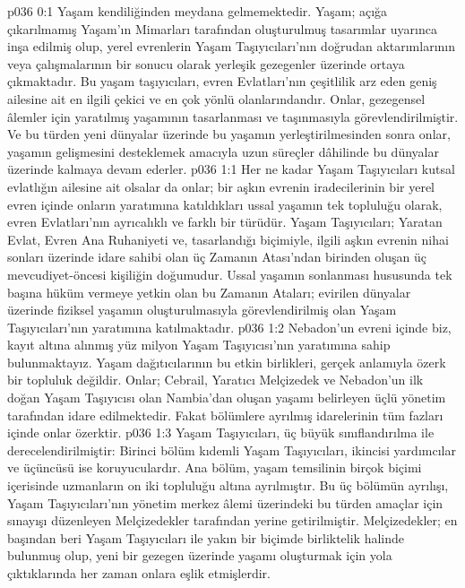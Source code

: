 \vs p036 0:1 Yaşam kendiliğinden meydana gelmemektedir. Yaşam; açığa çıkarılmamış Yaşam’ın Mimarları tarafından oluşturulmuş tasarımlar uyarınca inşa edilmiş olup, yerel evrenlerin Yaşam Taşıyıcıları’nın doğrudan aktarımlarının veya çalışmalarının bir sonucu olarak yerleşik gezegenler üzerinde ortaya çıkmaktadır. Bu yaşam taşıyıcıları, evren Evlatları’nın çeşitlilik arz eden geniş ailesine ait en ilgili çekici ve en çok yönlü olanlarındandır. Onlar, gezegensel âlemler için yaratılmış yaşamının tasarlanması ve taşınmasıyla görevlendirilmiştir. Ve bu türden yeni dünyalar üzerinde bu yaşamın yerleştirilmesinden sonra onlar, yaşamın gelişmesini desteklemek amacıyla uzun süreçler dâhilinde bu dünyalar üzerinde kalmaya devam ederler.
\vs p036 1:1 Her ne kadar Yaşam Taşıyıcıları kutsal evlatlığın ailesine ait olsalar da onlar; bir aşkın evrenin iradecilerinin bir yerel evren içinde onların yaratımına katıldıkları ussal yaşamın tek topluluğu olarak, evren Evlatları’nın ayrıcalıklı ve farklı bir türüdür. Yaşam Taşıyıcıları; Yaratan Evlat, Evren Ana Ruhaniyeti ve, tasarlandığı biçimiyle, ilgili aşkın evrenin nihai sonları üzerinde idare sahibi olan üç Zamanın Atası’ndan birinden oluşan üç mevcudiyet\hyp{}öncesi kişiliğin doğumudur. Ussal yaşamın sonlanması hususunda tek başına hüküm vermeye yetkin olan bu Zamanın Ataları; evirilen dünyalar üzerinde fiziksel yaşamın oluşturulmasıyla görevlendirilmiş olan Yaşam Taşıyıcıları’nın yaratımına katılmaktadır.
\vs p036 1:2 Nebadon’un evreni içinde biz, kayıt altına alınmış yüz milyon Yaşam Taşıyıcısı’nın yaratımına sahip bulunmaktayız. Yaşam dağıtıcılarının bu etkin birlikleri, gerçek anlamıyla özerk bir topluluk değildir. Onlar; Cebrail, Yaratıcı Melçizedek ve Nebadon’un ilk doğan Yaşam Taşıyıcısı olan Nambia’dan oluşan yaşamı belirleyen üçlü yönetim tarafından idare edilmektedir. Fakat bölümlere ayrılmış idarelerinin tüm fazları içinde onlar özerktir.
\vs p036 1:3 Yaşam Taşıyıcıları, üç büyük sınıflandırılma ile derecelendirilmiştir: Birinci bölüm kıdemli Yaşam Taşıyıcıları, ikincisi yardımcılar ve üçüncüsü ise koruyuculardır. Ana bölüm, yaşam temsilinin birçok biçimi içerisinde uzmanların on iki topluluğu altına ayrılmıştır. Bu üç bölümün ayrılışı, Yaşam Taşıyıcıları’nın yönetim merkez âlemi üzerindeki bu türden amaçlar için sınayışı düzenleyen Melçizedekler tarafından yerine getirilmiştir. Melçizedekler; en başından beri Yaşam Taşıyıcıları ile yakın bir biçimde birliktelik halinde bulunmuş olup, yeni bir gezegen üzerinde yaşamı oluşturmak için yola çıktıklarında her zaman onlara eşlik etmişlerdir.
